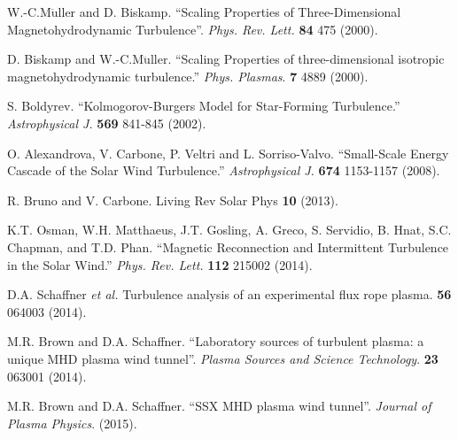 \documentclass[aps,prl,amsmath,amssymb,reprint,superscriptaddress]{revtex4-1} %
\begin{document}
\begin{thebibliography}{99}
 W.-C.M$\ddot{\mathrm{u}}$ller and D. Biskamp. ``Scaling Properties of Three-Dimensional Magnetohydrodynamic Turbulence''. {\it Phys. Rev. Lett.} {\bf 84} 475 (2000).

 D. Biskamp and W.-C.M$\ddot{\mathrm{u}}$ller. ``Scaling Properties of three-dimensional isotropic magnetohydrodynamic turbulence.'' {\it Phys. Plasmas}. {\bf 7} 4889 (2000).

 S. Boldyrev. ``Kolmogorov-Burgers Model for Star-Forming Turbulence.'' {\it Astrophysical J.} {\bf 569} 841-845 (2002).

 O. Alexandrova, V. Carbone, P. Veltri and L. Sorriso-Valvo. ``Small-Scale Energy Cascade of the Solar Wind Turbulence.'' {\it Astrophysical J.} {\bf 674} 1153-1157 (2008).

 R. Bruno and V. Carbone. Living Rev Solar Phys {\bf 10} (2013).

 K.T. Osman, W.H. Matthaeus, J.T. Gosling, A. Greco, S. Servidio, B. Hnat, S.C. Chapman, and T.D. Phan. ``Magnetic Reconnection and Intermittent Turbulence in the Solar Wind.'' {\it Phys. Rev. Lett.} {\bf 112} 215002 (2014).

 D.A. Schaffner {\it et al.} Turbulence analysis of an experimental flux rope plasma. {\bf 56} 064003 (2014).

 M.R. Brown and D.A. Schaffner. ``Laboratory sources of turbulent plasma: a unique MHD plasma wind tunnel''. {\it Plasma Sources and Science Technology}. {\bf 23} 063001 (2014).

 M.R. Brown and D.A. Schaffner. ``SSX MHD plasma wind tunnel''. {\it Journal of Plasma Physics}. (2015).







\end{thebibliography}
\end{document}
